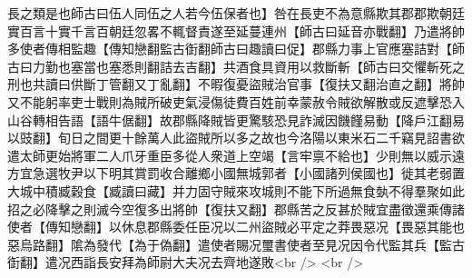 長之類是也師古曰伍人同伍之人若今伍保者也】咎在長吏不為意縣欺其郡郡欺朝廷實百言十實千言百朝廷忽畧不輒督責遂至延蔓連州【師古曰延音亦戰翻】乃遣將帥多使者傳相監趣【傳知戀翻監古衘翻師古曰趣讀曰促】郡縣力事上官應塞詰對【師古曰力勤也塞當也塞悉則翻詰去吉翻】共酒食具資用以救斷斬【師古曰交懼斬死之刑也共讀曰供斷丁管翻又丁亂翻】不暇復憂盜賊治官事【復扶又翻治直之翻】將帥又不能躬率吏士戰則為賊所破吏氣浸傷徒費百姓前幸蒙赦令賊欲解散或反遮擊恐入山谷轉相告語【語牛倨翻】故郡縣降賊皆更驚駭恐見詐滅因饑饉易動【降戶江翻易以豉翻】旬日之間更十餘萬人此盜賊所以多之故也今洛陽以東米石二千竊見詔書欲遣太師更始將軍二人爪牙重臣多從人衆道上空竭【言牢禀不給也】少則無以威示遠方宜急選牧尹以下明其賞罰收合離鄉小國無城郭者【小國諸列侯國也】徙其老弱置大城中積臧穀食【臧讀曰藏】并力固守賊來攻城則不能下所過無食埶不得羣聚如此招之必降擊之則滅今空復多出將帥【復扶又翻】郡縣苦之反甚於賊宜盡徵還乘傳諸使者【傳知戀翻】以休息郡縣委任臣况以二州盜賊必平定之莽畏惡况【畏惡其能也惡烏路翻】隂為發代【為于偽翻】遣使者賜况璽書使者至見况因令代監其兵【監古衘翻】遣况西詣長安拜為師尉大夫况去齊地遂敗<br />
<br />
